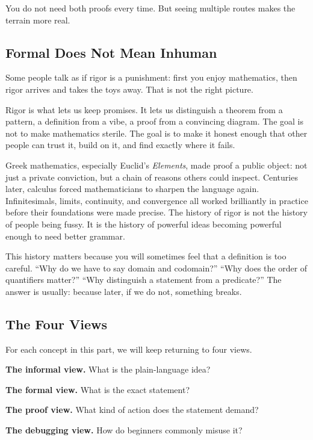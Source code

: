 You do not need both proofs every time. But seeing multiple routes makes the terrain more real.

\subsection{Formal Does Not Mean Inhuman}

Some people talk as if rigor is a punishment: first you enjoy mathematics, then rigor arrives and takes the toys away. That is not the right picture.

Rigor is what lets us keep promises. It lets us distinguish a theorem from a pattern, a definition from a vibe, a proof from a convincing diagram. The goal is not to make mathematics sterile. The goal is to make it honest enough that other people can trust it, build on it, and find exactly where it fails.

\begin{historybox}
Greek mathematics, especially Euclid's \emph{Elements}, made proof a public object: not just a private conviction, but a chain of reasons others could inspect. Centuries later, calculus forced mathematicians to sharpen the language again. Infinitesimals, limits, continuity, and convergence all worked brilliantly in practice before their foundations were made precise. The history of rigor is not the history of people being fussy. It is the history of powerful ideas becoming powerful enough to need better grammar.
\end{historybox}

This history matters because you will sometimes feel that a definition is too careful. ``Why do we have to say domain and codomain?'' ``Why does the order of quantifiers matter?'' ``Why distinguish a statement from a predicate?'' The answer is usually: because later, if we do not, something breaks.

\subsection{The Four Views}

For each concept in this part, we will keep returning to four views.

\textbf{The informal view.} What is the plain-language idea?

\textbf{The formal view.} What is the exact statement?

\textbf{The proof view.} What kind of action does the statement demand?

\textbf{The debugging view.} How do beginners commonly misuse it?

